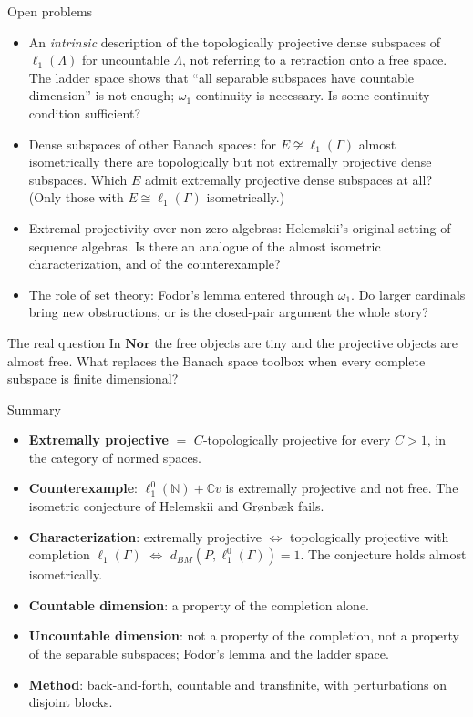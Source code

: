 \documentclass[10pt,aspectratio=169]{beamer}
\newcommand{\Nor}{\mathbf{Nor}}
\newcommand{\lo}[1]{\ell_1^0(#1)}
\newcommand{\ellone}[1]{\ell_1(#1)}
\newcommand{\BM}{d_{BM}}
\newcommand{\NN}{\mathbb N}
\newcommand{\CC}{\mathbb C}
\begin{document}
\begin{frame}{Open problems}
  \begin{itemize}
    \item An \emph{intrinsic} description of the topologically projective dense
      subspaces of $\ellone\Lambda$ for uncountable $\Lambda$, not referring to a
      retraction onto a free space. The ladder space shows that
      ``all separable subspaces have countable dimension'' is not enough;
      $\omega_1$-continuity is necessary. Is some continuity condition sufficient?
    \item Dense subspaces of other Banach spaces: for $E\not\cong\ellone\Gamma$
      almost isometrically there are topologically but not extremally projective
      dense subspaces. Which $E$ admit extremally projective dense subspaces at all?
      (Only those with $E\cong\ellone\Gamma$ isometrically.)
    \item Extremal projectivity over non-zero algebras: Helemskii's original
      setting of sequence algebras. Is there an analogue of the almost isometric
      characterization, and of the counterexample?
    \item The role of set theory: Fodor's lemma entered through $\omega_1$.
      Do larger cardinals bring new obstructions, or is the closed-pair argument
      the whole story?
  \end{itemize}
  \begin{alertblock}{The real question}
    In $\Nor$ the free objects are tiny and the projective objects are
    almost free. What replaces the Banach space toolbox when every complete
    subspace is finite dimensional?
  \end{alertblock}
\end{frame}

\begin{frame}{Summary}
  \begin{itemize}
    \item \textbf{Extremally projective} $=$ $C$-topologically projective for every
      $C>1$, in the category of normed spaces.
    \item \textbf{Counterexample}: $\lo\NN+\CC v$ is extremally projective and not
      free. The isometric conjecture of Helemskii and Gr{\o}nb{\ae}k fails.
    \item \textbf{Characterization}: extremally projective $\iff$ topologically
      projective with completion $\ellone\Gamma$ $\iff$ $\BM(P,\lo\Gamma)=1$.
      The conjecture holds almost isometrically.
    \item \textbf{Countable dimension}: a property of the completion alone.
    \item \textbf{Uncountable dimension}: not a property of the completion, not
      a property of the separable subspaces; Fodor's lemma and the ladder space.
    \item \textbf{Method}: back-and-forth, countable and transfinite, with
      perturbations on disjoint blocks.
  \end{itemize}
  \vfill
  \vfill
\end{frame}
\end{document}
